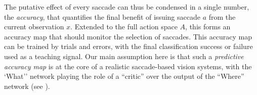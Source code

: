 The putative effect of every saccade can thus be condensed in a single number, the \emph{accuracy}, that quantifies the final benefit of issuing saccade $a$ %
from the current observation $x$. 
 Extended to the full action space $A$, this forms an accuracy map that should monitor the selection of saccades. %
This accuracy map can be trained by trials and errors, with the final classification success or failure used as a teaching signal. Our main assumption here is that such a \emph{predictive accuracy map} is at the core of a realistic saccade-based vision systems, with the `What'' network playing the role of a ``critic'' over the output of the ``Where'' network (see \cite{sutton1998reinforcement}).

